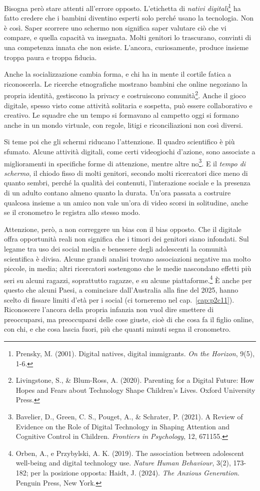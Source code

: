 Bisogna però stare attenti all'errore opposto. L'etichetta di \textit{nativi digitali}\footnote{Prensky, M. (2001). Digital natives, digital immigrants. \textit{On the Horizon}, 9(5), 1-6.} ha fatto credere che i bambini diventino esperti solo perché usano la tecnologia. Non è così. Saper scorrere uno schermo non significa saper valutare ciò che vi compare, e quella capacità va insegnata. Molti genitori lo trascurano, convinti di una competenza innata che non esiste. L'ancora, curiosamente, produce insieme troppa paura e troppa fiducia.

Anche la socializzazione cambia forma, e chi ha in mente il cortile fatica a riconoscerla. Le ricerche etnografiche mostrano bambini che online negoziano la propria identità, gestiscono la privacy e costruiscono comunità\footnote{Livingstone, S., \& Blum-Ross, A. (2020). Parenting for a Digital Future: How Hopes and Fears about Technology Shape Children's Lives. Oxford University Press.}. Anche il gioco digitale, spesso visto come attività solitaria e sospetta, può essere collaborativo e creativo. Le squadre che un tempo si formavano al campetto oggi si formano anche in un mondo virtuale, con regole, litigi e riconciliazioni non così diversi.

Si teme poi che gli schermi riducano l'attenzione. Il quadro scientifico è più sfumato. Alcune attività digitali, come certi videogiochi d'azione, sono associate a miglioramenti in specifiche forme di attenzione, mentre altre no\footnote{Bavelier, D., Green, C. S., Pouget, A., \& Schrater, P. (2021). A Review of Evidence on the Role of Digital Technology in Shaping Attention and Cognitive Control in Children. \textit{Frontiers in Psychology}, 12, 671155.}. E il \textit{tempo di schermo}, il chiodo fisso di molti genitori, secondo molti ricercatori dice meno di quanto sembri, perché la qualità dei contenuti, l'interazione sociale e la presenza di un adulto contano almeno quanto la durata. Un'ora passata a costruire qualcosa insieme a un amico non vale un'ora di video scorsi in solitudine, anche se il cronometro le registra allo stesso modo.

Attenzione, però, a non correggere un bias con il bias opposto. Che il digitale offra opportunità reali non significa che i timori dei genitori siano infondati. Sul legame tra uso dei social media e benessere degli adolescenti la comunità scientifica è divisa. Alcune grandi analisi trovano associazioni negative ma molto piccole, in media; altri ricercatori sostengono che le medie nascondano effetti più seri su alcuni ragazzi, soprattutto ragazze, e su alcune piattaforme.\footnote{Orben, A., e Przybylski, A. K. (2019). The association between adolescent well-being and digital technology use. \textit{Nature Human Behaviour}, 3(2), 173-182; per la posizione opposta: Haidt, J. (2024). \textit{The Anxious Generation}. Penguin Press, New York.} È anche per questo che alcuni Paesi, a cominciare dall'Australia alla fine del 2025, hanno scelto di fissare limiti d'età per i social (ci torneremo nel cap.~\ref{cap:p2c11}). Riconoscere l'ancora della propria infanzia non vuol dire smettere di preoccuparsi, ma preoccuparsi delle cose giuste, cioè di che cosa fa il figlio online, con chi, e che cosa lascia fuori, più che quanti minuti segna il cronometro.

